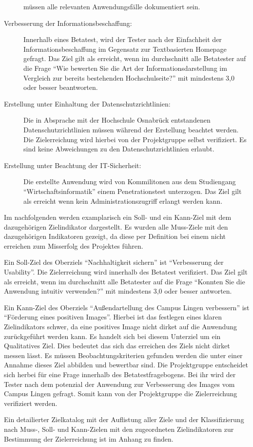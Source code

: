 \begin{description}
	müssen alle relevanten Anwendungsfälle dokumentiert sein.
	\item[Verbesserung der Informationsbeschaffung:] Innerhalb eines Betatest, wird
	der Tester nach der Einfachheit der Informationsbeschaffung im
	Gegensatz zur Textbasierten Homepage gefragt. Das Ziel gilt als erreicht, wenn
	im durchschnitt alle Betatester auf die Frage "`Wie bewerten Sie die Art der
	Informationsdarstellung im Vergleich zur bereits bestehenden Hochschulseite?"'
	mit mindestens 3,0 oder besser beantworten.
	\item[Erstellung unter Einhaltung der Datenschutzrichtlinien:] Die in Absprache
	mit der Hochschule Osnabrück entstandenen Datenschutzrichtlinien müssen während
	der Erstellung beachtet werden. Die Zielerreichung wird hierbei von der
	Projektgruppe selbst verifiziert. Es sind keine Abweichungen zu den
	Datenschutzrichtlinien erlaubt.
	\item[Erstellung unter Beachtung der IT-Sicherheit:] Die erstellte Anwendung
	wird von Kommilitonen aus dem Studiengang "`Wirtschaftsinformatik"' einem
	Penetrationstest unterzogen. Das Ziel gilt als erreicht wenn kein
	Administrationszugriff erlangt werden kann. 
\end{description}

Im nachfolgenden werden examplarisch ein Soll- und ein Kann-Ziel mit dem
dazugehörigen Zielindikator dargestellt. Es wurden alle Muss-Ziele mit den
dazugehörigen Indikatoren gezeigt, da diese per Definition bei einem nicht
erreichen zum Misserfolg des Projektes führen.

Ein Soll-Ziel des Oberziels "`Nachhaltigkeit sichern"' ist "`Verbesserung der
Usability"'. Die Zielerreichung wird innerhalb des Betatest verifiziert. Das
Ziel gilt als erreicht, wenn im durchschnitt alle Betatester auf die Frage "`Konnten
Sie die Anwendung intuitiv verwenden?"' mit mindestens 3,0 oder besser
antworten. 

Ein Kann-Ziel des Oberziels "`Außendartellung des Campus Lingen
verbessern"' ist "`Förderung eines positiven Images"'. Hierbei ist das festlegen
eines klaren Zielindikators schwer, da eine positives Image nicht dirket auf die
Anwendung zurückgeführt werden kann. Es handelt sich bei diesem Unterziel um ein
Qualitatives Ziel. %
Dies bedeutet das sich das erreichen des Ziels nicht dirket messen lässt. Es
müssen Beobachtungskriterien gefunden werden die unter einer Annahme dieses Ziel
abbilden und bewertbar sind. Die Projektgruppe entscheidet sich herbei für eine
Frage innerhalb des Betatestfragebogens. Bei ihr wird der Tester nach dem
potenzial der Anwendung zur Verbesserung des Images vom Campus Lingen gefragt.
Somit kann von der Projektgruppe die Zielerreichung verifiziert werden.

Ein detailierter Zielkatalog mit der Auflistung aller Ziele und der
Klassifizierung nach Muss-, Soll- und Kann-Zielen mit den zugeordneten
Zielindikatoren zur Bestimmung der Zielerreichung ist im Anhang %
zu finden.











